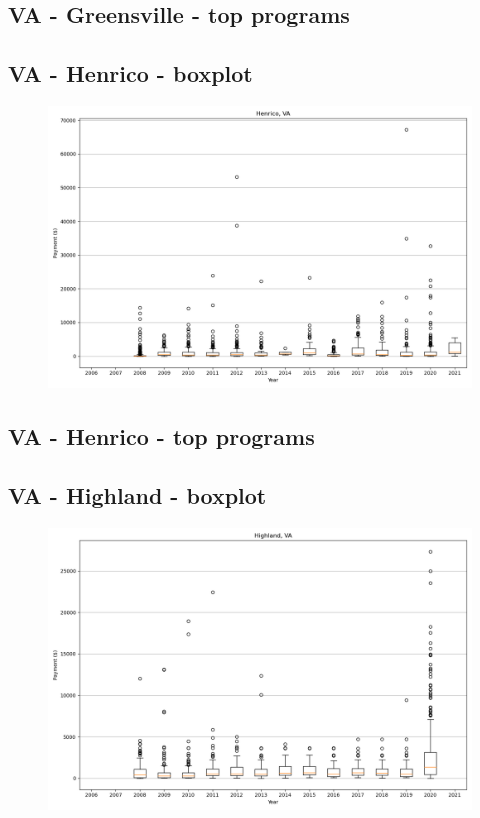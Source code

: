 \subsection*{VA - Greensville - top programs}

\newpage
\subsection*{VA - Henrico - boxplot}
\begin{figure}[h]
\centering
\includegraphics[width=7in]{../output/boxplots/counties/Henrico-VA_boxplot.png}
\end{figure}


\subsection*{VA - Henrico - top programs}

\newpage
\subsection*{VA - Highland - boxplot}
\begin{figure}[h]
\centering
\includegraphics[width=7in]{../output/boxplots/counties/Highland-VA_boxplot.png}
\end{figure}



